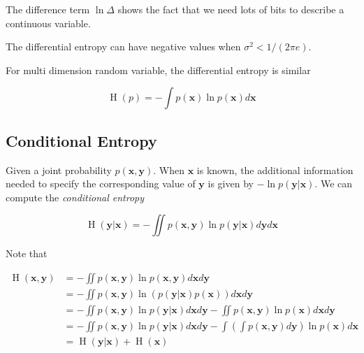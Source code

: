 \documentclass{article}
\begin{document}
            The difference term $ \ln \Delta $ shows the fact that we need lots of bits to
            describe a continuous variable.

            The differential entropy can have negative values when $ \sigma^2 < 1 / (2 \pi e) $.

            For multi dimension random variable, the differential entropy is similar

            \begin{equation*}
                \operatorname{H}(p) = - \int p(\mathbf{x}) \ln p(\mathbf{x}) d \mathbf{x} 
            \end{equation*}

        \subsection{Conditional Entropy}

            Given a joint probability $ p(\mathbf{x}, \mathbf{y}) $. When $
            \mathbf{x} $ is known, the additional information needed to specify
            the corresponding value of $ \mathbf{y} $ is given by $ - \ln
            p(\mathbf{y} | \mathbf{x}) $. We can compute the
            \textit{conditional entropy}

            \begin{equation*}
                \operatorname{H}(\mathbf{y} | \mathbf{x}) = 
                 - \iint p(\mathbf{x}, \mathbf{y})
                    \ln p( \mathbf{y} | \mathbf{x} ) d \mathbf{y} d \mathbf{x}
            \end{equation*}

            Note that

            \begin{align*}
                \operatorname{H}(\mathbf{x}, \mathbf{y})
                      &= - \iint p(\mathbf{x}, \mathbf{y})
                         \ln p(\mathbf{x}, \mathbf{y}) d \mathbf{x} d \mathbf{y}                    \\
                      &= - \iint p(\mathbf{x}, \mathbf{y}) 
                         \ln ( p(\mathbf{y} | \mathbf{x}) p(\mathbf{x})) d \mathbf{x} d \mathbf{y}  \\
                      &= - \iint p(\mathbf{x}, \mathbf{y}) \ln p(\mathbf{y} | \mathbf{x})
                        d \mathbf{x} d \mathbf{y} -
                        \iint p(\mathbf{x}, \mathbf{y}) \ln p(\mathbf{x}) d \mathbf{x} d \mathbf{y} \\
                      &= - \iint p(\mathbf{x}, \mathbf{y}) \ln p(\mathbf{y} | \mathbf{x}) d \mathbf{x}
                          d \mathbf{y} - \int \left( \int p(\mathbf{x}, \mathbf{y}) d \mathbf{y} \right)
                          \ln p(\mathbf{x}) d \mathbf{x}                                            \\
                      &= \operatorname{H} (\mathbf{y} | \mathbf{x}) + \operatorname{H} (\mathbf{x})
            \end{align*}
\end{document}
